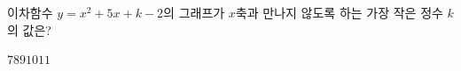이차함수 $y=x^2+5x+k-2$의 그래프가 $x$축과 만나지 않도록 하는 가장 작은 정수 $k$의 값은?
\begin{choices32}{$7$}{$8$}{$9$}{$10$}{$11$}\end{choices32}
